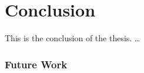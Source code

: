 
\chapter{Conclusion}
\label{ch:Conclusion}
This is the conclusion of the thesis.
\dots

\subsection{Future Work}
\label{sec:Conclusion:FutureWork}